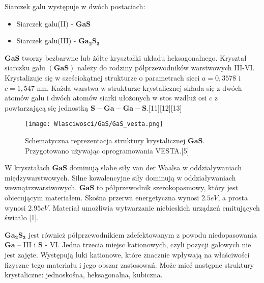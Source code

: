 Siarczek galu występuje w dwóch postaciach:
\begin{itemize}
	\item Siarczek galu(II) - $\mathbf{GaS}$
	\item Siarczek galu(III) - $\mathbf{Ga_{2}S_{3}}$
\end{itemize}
$\mathbf{GaS}$ tworzy bezbarwne lub żółte kryształki układu heksagonalnego. Kryształ siarczku galu $\mathbf{(GaS)}$ należy do rodziny półprzewodników warstwowych III-VI. Krystalizuje się w sześciokątnej strukturze o parametrach sieci $a = 0,3578$ i $c = 1,547$ nm. Każda warstwa w strukturze krystalicznej składa się z dwóch atomów galu i dwóch atomów siarki ułożonych w stos wzdłuż osi $c$ z powtarzającą się jednostką $\mathbf{S-Ga-Ga-S}$.[11][12][13]
\begin{figure}[H]
	\begin{center}
		\texttt{[image: Wlasciwosci/GaS/GaS\_vesta.png]}
		\caption{Schematyczna reprezentacja struktury krystalicznej $\mathbf{GaS}$. Przygotowano używając oprogramowania VESTA.[5]}
	\end{center}
\end{figure}

W kryształach $\mathbf{GaS}$ dominują słabe siły van der Waalsa w oddziaływaniach międzywarstwowych. Silne kowalencyjne siły dominują w oddziaływaniach wewnątrzwarstwowych.
$\mathbf{GaS}$ to półprzewodnik szerokopasmowy, który jest obiecującym materiałem. Skośna przerwa energetyczna wynosi $2.5eV$, a prosta wynosi $2.95eV$. Materiał umożliwia
wytwarzanie niebieskich urządzeń emitujących światło [1].

$\mathbf{Ga_{2}S_{3}}$ jest również półprzewodnikiem zdefektowanym z powodu niedopasowania $\mathbf{Ga}$ – III i $\mathbf{S}$ - VI. Jedna trzecia miejsc kationowych, czyli pozycji galowych nie jest zajęte. Występują luki kationowe, które znacznie wpływają na właściwości fizyczne tego materiału i jego obszar zastosowań. Może mieć następne struktury krystaliczne: jednoskośna, heksagonalna, kubiczna.

